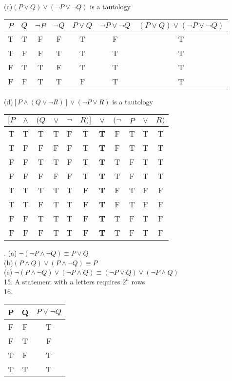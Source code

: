 \documentclass{article}
\begin{document}
 (c)$(P \vee Q)\vee (\neg P \vee \neg Q)$ is a tautology\\
 \begin{tabular}{c|c|c|c|c|c|c}
 $P$&$Q$&$\neg P$&$\neg Q$&$P \vee Q$&$\neg P \vee \neg Q$&$(P \vee Q)\vee (\neg P \vee \neg Q)$\\
 \hline
 T&T&F&F&T&F&T\\
 T&F&F&T&T&T&T\\
 F&T&T&F&T&T&T\\
 F&F&T&T&F&T&T\\
 \end{tabular}
 \vspace{2em}
 \linebreak
 (d)$[P \wedge (Q \vee \neg R)]\vee (\neg P \vee R)$ is a tautology\\
 \begin{tabular}{ccccccccccc}
 $[P$&$\wedge$&$(Q$&$\vee$&$\neg$&$R)]$&$\vee$&$(\neg$&$P$&$\vee$&$R)$\\
 \hline
 T&T&T&T&F&T&\textbf{T}&F&T&T&T\\
 T&F&F&F&F&T&\textbf{T}&F&T&T&T\\
 F&F&T&T&F&T&\textbf{T}&T&F&T&T\\
 F&F&F&F&F&T&\textbf{T}&T&F&T&T\\
 T&T&T&T&T&F&\textbf{T}&F&T&F&F\\
 T&T&F&T&T&F&\textbf{T}&F&T&F&F\\
 F&F&T&T&T&F&\textbf{T}&T&F&T&F\\
 F&F&F&T&T&F&\textbf{T}&T&F&T&F\\
 \end{tabular}
 \vspace{2em}
 \linebreak
 . (a) $\neg(\neg P \wedge \neg Q) \equiv P \vee Q$\\
(b)$(P \wedge Q) \vee (P \wedge \neg Q) \equiv P$\\
(c) $\neg(P \wedge \neg Q) \vee (\neg P \wedge Q) \equiv (\neg P \vee Q) \vee (\neg P \wedge Q)$\\
 
 
 15. A statement with $n$ letters requires $2^n$ rows\\
 
 16.\\
 \begin{tabular}{c|c|c}
 P&Q&$P \vee \neg Q$\\
 \hline
 F&F&T\\
 F&T&F\\
 T&F&T\\
 T&T&T\\
 \end{tabular}
  \vspace{2em}
 \linebreak
 
\end{document}
